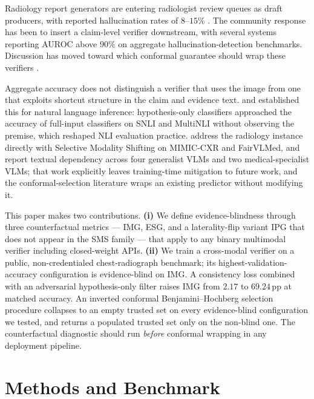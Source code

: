 \documentclass{article}
\begin{document}
Radiology report generators are entering radiologist review queues
as draft producers, with reported hallucination rates of
$8$--$15\%$ \citep{zhang2025radflag, hardy2025rextrust}. The
community response has been to insert a claim-level verifier
downstream, with several systems reporting AUROC above $90\%$ on
aggregate hallucination-detection benchmarks. Discussion has
moved toward which conformal guarantee should wrap these verifiers
\citep{mohri2024conformal, angelopoulos2021gentle, gui2024conformal,
li2025conflvlm}.

Aggregate accuracy does not distinguish a verifier that uses the
image from one that exploits shortcut structure in the claim and
evidence text. \citet{gururangan2018annotation} and
\citet{poliak2018hypothesis} established this for natural language
inference: hypothesis-only classifiers approached the accuracy of
full-input classifiers on SNLI and MultiNLI without observing the
premise, which reshaped NLI evaluation practice.
\citet{restrepo2025sms} address the radiology instance directly
with Selective Modality Shifting on MIMIC-CXR and FairVLMed, and
report textual dependency across four generalist VLMs and two
medical-specialist VLMs; that work explicitly leaves training-time
mitigation to future work, and the conformal-selection literature
wraps an existing predictor without modifying it.

This paper makes two contributions. \textbf{(i)} We define
evidence-blindness through three counterfactual metrics --- IMG, ESG,
and a laterality-flip variant IPG that does not appear in the SMS
family --- that apply to any binary multimodal verifier including
closed-weight APIs. \textbf{(ii)} We train a cross-modal verifier
on a public, non-credentialed chest-radiograph benchmark; its
highest-validation-accuracy configuration is evidence-blind on IMG.
A consistency loss combined with an adversarial hypothesis-only
filter raises IMG from $2.17$ to $69.24$\,pp at matched accuracy. An
inverted conformal Benjamini--Hochberg selection procedure collapses
to an empty trusted set on every evidence-blind configuration we
tested, and returns a populated trusted set only on the non-blind
one. The counterfactual diagnostic should run \emph{before}
conformal wrapping in any deployment pipeline.

\section{Methods and Benchmark}
\label{sec:methods}
\end{document}
